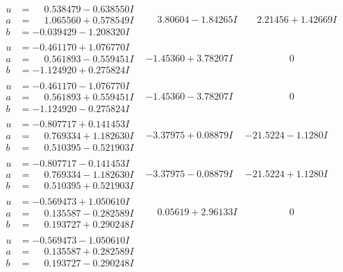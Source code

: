 \documentclass[1p]{elsarticle_modified}
\theoremstyle{definition}
\begin{document}
$$\begin{array}{c|c|c}
\begin{aligned}
u &= \phantom{-}0.538479 - 0.638550 I \\
a &= \phantom{-}1.065560 + 0.578549 I \\
b &= -0.039429 - 1.208320 I\end{aligned}
 & \phantom{-}3.80604 - 1.84265 I & \phantom{-}2.21456 + 1.42669 I \\ \hline\begin{aligned}
u &= -0.461170 + 1.076770 I \\
a &= \phantom{-}0.561893 - 0.559451 I \\
b &= -1.124920 + 0.275824 I\end{aligned}
 & -1.45360 + 3.78207 I & \phantom{-0.000000 } 0 \\ \hline\begin{aligned}
u &= -0.461170 - 1.076770 I \\
a &= \phantom{-}0.561893 + 0.559451 I \\
b &= -1.124920 - 0.275824 I\end{aligned}
 & -1.45360 - 3.78207 I & \phantom{-0.000000 } 0 \\ \hline\begin{aligned}
u &= -0.807717 + 0.141453 I \\
a &= \phantom{-}0.769334 + 1.182630 I \\
b &= \phantom{-}0.510395 - 0.521903 I\end{aligned}
 & -3.37975 + 0.08879 I & -21.5224 - 1.1280 I \\ \hline\begin{aligned}
u &= -0.807717 - 0.141453 I \\
a &= \phantom{-}0.769334 - 1.182630 I \\
b &= \phantom{-}0.510395 + 0.521903 I\end{aligned}
 & -3.37975 - 0.08879 I & -21.5224 + 1.1280 I \\ \hline\begin{aligned}
u &= -0.569473 + 1.050610 I \\
a &= \phantom{-}0.135587 - 0.282589 I \\
b &= \phantom{-}0.193727 + 0.290248 I\end{aligned}
 & \phantom{-}0.05619 + 2.96133 I & \phantom{-0.000000 } 0 \\ \hline\begin{aligned}
u &= -0.569473 - 1.050610 I \\
a &= \phantom{-}0.135587 + 0.282589 I \\
b &= \phantom{-}0.193727 - 0.290248 I\end{aligned}

\end{array}$$
\end{document}
